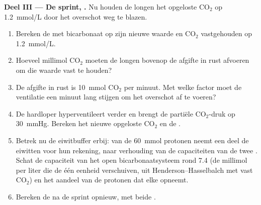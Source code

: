 \begin{problem}
\medskip
\noindent\textbf{Deel III --- De sprint, .}
Nu houden de longen het opgeloste $\mathrm{CO_2}$ op \qty{1.2}{mmol/L} door het
overschot weg te blazen.
\begin{enumerate}[resume]
  \item Bereken de  met bicarbonaat op zijn nieuwe waarde en
        $\mathrm{CO_2}$ vastgehouden op \qty{1.2}{mmol/L}.
  \item Hoeveel millimol $\mathrm{CO_2}$ moeten de longen bovenop de
        afgifte in rust afvoeren om die waarde vast te houden?
  \item De afgifte in rust is \qty{10}{mmol} $\mathrm{CO_2}$ per minuut.
        Met welke factor moet de ventilatie een minuut lang stijgen om het
        overschot af te voeren?
  \item De hardloper hyperventileert verder en brengt de partiële
        $\mathrm{CO_2}$-druk op \qty{30}{mmHg}. Bereken het nieuwe
        opgeloste $\mathrm{CO_2}$ en de .
  \item Betrek nu de eiwitbuffer erbij: van de \qty{60}{mmol} protonen
        neemt een deel de eiwitten voor hun rekening, naar verhouding van
        de capaciteiten van de twee . Schat de capaciteit van het
        open bicarbonaatsysteem rond  7.4 (de millimol  per liter
        die de  één eenheid verschuiven, uit Henderson--Hasselbalch met
        vast $\mathrm{CO_2}$) en het aandeel van de protonen dat elke
         opneemt.
  \item Bereken de  na de sprint opnieuw, met beide .
\end{enumerate}


\end{problem}
